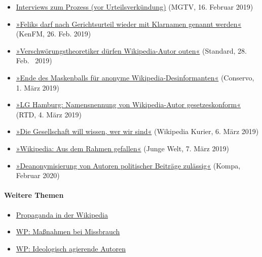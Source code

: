\begin{itemize}
\tightlist
\item
  \href{https://www.youtube.com/watch?v=Xr0CDRL4vKk}{Interviews zum
  Prozess (vor Urteilsverkündung)} (MGTV, 16. Februar 2019)
\item
  \href{https://kenfm.de/tagesdosis-26-2-2019-wikipedia-manipulationen-feliks-darf-nach-gerichtsurteil-wieder-mit-klarnamen-genannt-werden/}{»Feliks
  darf nach Gerichtsurteil wieder mit Klarnamen genannt werden«} (KenFM,
  26. Feb. 2019)
\item
  \href{https://derstandard.at/2000098702546/Verschwoerungstheoretiker-duerfen-Wikipedia-Autor-outen}{»Verschwörungstheoretiker
  dürfen Wikipedia-Autor outen«} (Standard, 28. Feb.~ 2019)
\item
  \href{https://conservo.wordpress.com/2019/03/01/sensationell-die-enttarnung-eines-denunzianten-das-ende-des-maskenballs-fuer-anonyme-wikipedia-desinformanten/}{»Ende
  des Maskenballs für anonyme Wikipedia-Desinformanten«} (Conservo, 1.
  März 2019)
\item
  \href{https://deutsch.rt.com/inland/85235-landgericht-hamburg-namensnennung-von-wikipedia/}{»LG
  Hamburg: Namensnennung von Wikipedia-Autor gesetzeskonform«} (RTD, 4.
  März 2019)
\item
  \href{https://de.wikipedia.org/wiki/Wikipedia:Kurier/Ausgabe_3_2019\#Die_Gesellschaft_will_wissen,_wer_wir_sind}{»Die
  Gesellschaft will wissen, wer wir sind«} (Wikipedia Kurier, 6. März
  2019)
\item
  \href{https://www.jungewelt.de/artikel/350538.aus-dem-rahmen-gefallen.html}{»Wikipedia:
  Aus dem Rahmen gefallen«} (Junge Welt, 7. März 2019)
\item
  \href{https://kanzleikompa.de/2020/02/18/olg-hamburg-deanonymisierung-von-autoren-politischer-beitraege-zulaessig/}{»Deanonymisierung
  von Autoren politischer Beiträge zulässig«} (Kompa, Februar 2020)
\end{itemize}

\hypertarget{weitere-themen}{%
\paragraph{Weitere Themen}\label{weitere-themen}}

\begin{itemize}
\tightlist
\item
  \href{https://swprs.org/propaganda-in-der-wikipedia/}{Propaganda in
  der Wikipedia}
\item
  \href{https://swprs.org/wikipedia-missbrauch-massnahmen/}{WP:
  Maßnahmen bei Missbrauch}
\item
  \href{https://swprs.org/wikipedia-manipulation-autoren/}{WP:
  Ideologisch agierende Autoren}
\end{itemize}


